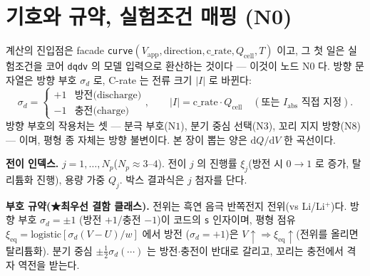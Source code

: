 \documentclass[11pt,a4paper]{article}
\newcommand{\dd}{\mathrm{d}}
\newcommand{\eq}{\mathrm{eq}}
\newcommand{\app}{\mathrm{app}}
\newcommand{\cell}{\mathrm{cell}}
\newcommand{\code}[1]{\texttt{#1}}
\begin{document}
\tableofcontents
\newpage

\section{기호와 규약, 실험조건 매핑 (N0)}\label{sec:notation}
계산의 진입점은 facade \code{curve}$(V_\app,\text{direction},\text{c\_rate},Q_\cell,T)$ 이고, 그 첫 일은 실험조건을
코어 \code{dqdv} 의 모델 입력으로 환산하는 것이다 — 이것이 노드 $\mathrm N0$ 다. 방향 문자열은 방향 부호 $\sigma_d$ 로,
C-rate 는 전류 크기 $|I|$ 로 바뀐다:
\begin{equation}
\sigma_d=\begin{cases}+1 & \text{방전(discharge)}\\ -1 & \text{충전(charge)}\end{cases},
\qquad
|I|=\text{c\_rate}\cdot Q_\cell\quad(\text{또는 }I_\mathrm{abs}\text{ 직접 지정}).
\label{eq:n0map}
\end{equation}
방향 부호의 작용처는 셋 — 분극 부호($\mathrm N1$), 분기 중심 선택($\mathrm N3$), 꼬리 지지 방향($\mathrm N8$) — 이며,
평형 종 자체는 방향 불변이다. 본 장이 뽑는 양은 $\dd Q/\dd V$ 한 곡선이다.

\textbf{전이 인덱스.} $j=1,\dots,N_p$($N_p\approx3$--$4$). 전이 $j$ 의 진행률 $\xi_j$(방전 시 $0\to1$ 로 증가, 탈리튬화 진행),
용량 가중 $Q_j$. 박스 결과식은 $j$ 첨자를 단다.

\textbf{부호 규약(★최우선 결함 클래스).} 전위는 흑연 음극 반쪽전지 전위(vs Li/Li$^+$)다. 방향 부호 $\sigma_d=\pm1$
(방전 $+1$/충전 $-1$)이 코드의 \code{s} 인자이며, 평형 점유 $\xi_\eq=\mathrm{logistic}[\sigma_d(V-U)/w]$ 에서 방전
($\sigma_d=+1$)은 $V\!\uparrow\Rightarrow\xi_\eq\!\uparrow$(전위를 올리면 탈리튬화). 분기 중심 $\pm\tfrac12\sigma_d(\cdots)$
는 방전$\cdot$충전이 반대로 갈리고, 꼬리는 충전에서 격자 역전을 받는다.
\end{document}
